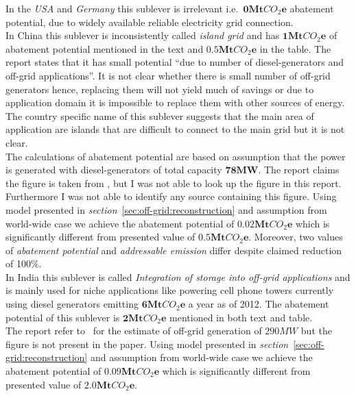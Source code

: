 \documentclass[11pt, twocolumn]{article}
\begin{document}
In the \emph{USA} and \emph{Germany} this sublever is irrelevant i.e.\ $\mathbf{0} \mathbf{Mt}CO_2\mathbf{e}$ abatement potential, due to widely available reliable electricity grid connection.\\

In China this sublever is inconsistently called \emph{island grid} and has $\mathbf{1} \mathbf{Mt}CO_2\mathbf{e}$ of abatement potential mentioned in the text and $\mathbf{0.5} \mathbf{Mt}CO_2\mathbf{e}$ in the table. The report states that it has small potential ``due to number of diesel-generators and off-grid applications''. It is not clear whether there is small number of off-grid generators hence, replacing them will not yield much of savings or due to application domain it is impossible to replace them with other sources of energy.\\
The country specific name of this sublever suggests that the main area of application are islands that are difficult to connect to the main grid but it is not clear.\\
The calculations of abatement potential are based on assumption that the power is generated with diesel-generators of total capacity $\mathbf{78} \mathbf{MW}$. The report claims the figure is taken from \citep{pieper2011revisiting}, but I was not able to look up the figure in this report. Furthermore I was not able to identify any source containing this figure. Using model presented in \emph{section}~\ref{sec:off-grid:reconstruction} and assumption from world-wide case we achieve the abatement potential of $\mathbf{0.02} \mathbf{Mt}CO_2\mathbf{e}$ which is significantly different from presented value of $\mathbf{0.5} \mathbf{Mt}CO_2\mathbf{e}$. Moreover, two values of \emph{abatement potential} and \emph{addressable emission} differ despite claimed reduction of 100\%.\\

In India this sublever is called \emph{Integration of storage into off-grid applications} and is mainly used for niche applications like powering cell phone towers currently using diesel generators emitting $\mathbf{6} \mathbf{Mt}CO_2\mathbf{e}$ a year as of 2012. The abatement potential of this sublever is $\mathbf{2} \mathbf{Mt}CO_2\mathbf{e}$ mentioned in both text and table.\\
The report refer to~\citep{pieper2011revisiting} for the estimate of off-grid generation of $290MW$ but the figure is not present in the paper. Using model presented in \emph{section}~\ref{sec:off-grid:reconstruction} and assumption from world-wide case we achieve the abatement potential of $\mathbf{0.09} \mathbf{Mt}CO_2\mathbf{e}$ which is significantly different from presented value of $\mathbf{2.0} \mathbf{Mt}CO_2\mathbf{e}$.
\end{document}
